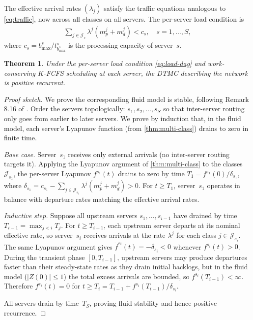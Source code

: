 \documentclass[11pt]{article}
\theoremstyle{plain}
\newtheorem{theorem}{Theorem}
\theoremstyle{definition}
\theoremstyle{remark}
\begin{document}
The effective arrival rates $(\lambda_j)$ satisfy the traffic equations analogous to \cref{eq:traffic}, now across all classes on all servers. The per-server load condition is
\begin{align}\label{eq:load-dag}
  \sum_{j\in\mathcal{J}_s}\lambda^j(m^j_p+m^j_d) < c_s, \quad s=1,\ldots,S,
\end{align}
where $c_s = b^s_{\max}/t^s_{b^s_{\max}}$ is the processing capacity of server~$s$.

\begin{theorem}\label{thm:dag}
Under the per-server load condition \cref{eq:load-dag} and work-conserving $K$-FCFS scheduling at each server, the DTMC describing the network is positive recurrent.
\end{theorem}

\begin{proof}[Proof sketch]
We prove the corresponding fluid model is stable, following Remark 8.16 of \cite{dai2020processing}.
Order the servers topologically: $s_1,s_2,\ldots,s_S$ so that inter-server routing only goes from earlier to later servers. We prove by induction that, in the fluid model, each server's Lyapunov function (from \cref{thm:multi-class}) drains to zero in finite time.

\emph{Base case.} Server~$s_1$ receives only external arrivals (no inter-server routing targets it). Applying the Lyapunov argument of \cref{thm:multi-class} to the classes $\mathcal{J}_{s_1}$, the per-server Lyapunov $f^{s_1}(t)$ drains to zero by time $T_1=f^{s_1}(0)/\delta_{s_1}$, where $\delta_{s_1} = c_{s_1} - \sum_{j\in\mathcal{J}_{s_1}}\lambda^j(m^j_p+m^j_d)>0$. For $t\ge T_1$, server~$s_1$ operates in balance with departure rates matching the effective arrival rates.

\emph{Inductive step.} Suppose all upstream servers $s_1,\ldots,s_{i-1}$ have drained by time $T_{i-1}=\max_{j<i}T_j$. For $t\ge T_{i-1}$, each upstream server departs at its nominal effective rate, so server~$s_i$ receives arrivals at the rate $\lambda^j$ for each class $j\in\mathcal{J}_{s_i}$. The same Lyapunov argument gives $\dot f^{s_i}(t)=-\delta_{s_i}<0$ whenever $f^{s_i}(t)>0$. During the transient phase $[0,T_{i-1}]$, upstream servers may produce departures faster than their steady-state rates as they drain initial backlogs, but in the fluid model ($|Z(0)|\le 1$) the total excess arrivals are bounded, so $f^{s_i}(T_{i-1})<\infty$. Therefore $f^{s_i}(t)=0$ for $t\ge T_i = T_{i-1}+f^{s_i}(T_{i-1})/\delta_{s_i}$.

All servers drain by time~$T_S$, proving fluid stability and hence positive recurrence.
\end{proof}
\end{document}
